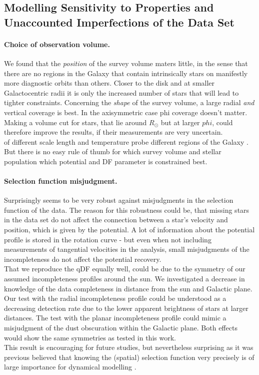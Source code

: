 \subsection{Modelling Sensitivity to Properties and Unaccounted Imperfections of the Data Set}

\paragraph{Choice of observation volume.} We found that the \emph{position} of the survey volume maters little, in the sense that there are no regions in the Galaxy that contain intrinsically stars on manifestly more diagnostic orbits than others. Closer to the disk and at smaller Galactocentric radii it is only the increased number of stars that will lead to tighter constraints. Concerning the \emph{shape} of the survey volume, a large radial \emph{and} vertical coverage is best. In the axisymmetric case phi coverage doesn't matter. Making a volume cut for stars, that lie around $R_\odot$ but at larger $phi$, could therefore improve the results, if their measurements are very uncertain.
\\\MAPs of different scale length and temperature probe different regions of the Galaxy \citep{bov13}. But there is no easy rule of thumb for which survey volume and stellar population which potential and DF parameter is constrained best.

\paragraph{Selection function misjudgment.} Surprisingly \RM seems to be very robust against misjudgments in the selection function of the data. The reason for this robustness could be, that missing stars in the data set do not affect the connection between a star's velocity and position, which is given by the potential. A lot of information about the potential profile is stored in the rotation curve - but even when not including measurements of tangential velocities in the analysis, small misjudgments of the incompleteness do not affect the potential recovery.
\\That we reproduce the qDF equally well, could be due to the symmetry of our assumed incompleteness profiles around the sun. We investigated a decrease in knowledge of the data completeness in distance from the sun and Galactic plane. Our test with the radial incompleteness profile could be understood as a decreasing detection rate due to the lower apparent brightness of stars at larger distances. The test with the planar incompleteness profile could mimic a misjudgment of the dust obscuration within the Galactic plane. Both effects would show the same symmetries as tested in this work. 
\\This result is encouraging for future studies, but nevertheless surprising as it was previous believed that knowing the (spatial) selection function very precisely is of large importance for dynamical modelling \citep{rix13}.


